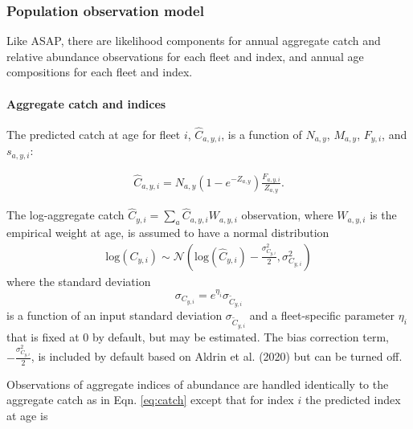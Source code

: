 \documentclass[]{article}
\let\oldparagraph\paragraph
\renewcommand{\paragraph}[1]{\oldparagraph{#1}\mbox{}}
\begin{document}
\hypertarget{population-observation-model}{%
\subsubsection{Population observation
model}\label{population-observation-model}}

Like ASAP, there are likelihood components for annual aggregate catch
and relative abundance observations for each fleet and index, and annual
age compositions for each fleet and index.

\hypertarget{aggregate-catch-and-indices}{%
\paragraph{Aggregate catch and
indices}\label{aggregate-catch-and-indices}}

The predicted catch at age for fleet \(i\), \(\hat{C}_{a,y,i}\), is a
function of \(N_{a,y}\), \(M_{a,y}\), \(F_{y,i}\), and \(s_{a,y,i}\):

\begin{equation}
\label{eq:predcatch}
  \begin{array}{ccc}
    \hat{C}_{a,y,i} = N_{a,y} \left(1- e^{-Z_{a,y}}\right)\frac{F_{a,y,i}}{Z_{a,y}}.
  \end{array}
\end{equation}

The log-aggregate catch
\(\hat{C}_{y,i} = \sum_a \hat{C}_{a,y,i}W_{a,y,i}\) observation, where
\(W_{a,y,i}\) is the empirical weight at age, is assumed to have a
normal distribution \begin{equation}
\label{eq:catch}
  \begin{array}{ccc}
    \text{log}(C_{y,i}) \sim \mathcal{N}\left( \text{log}(\hat{C}_{y,i}) - \frac{\sigma^2_{C_{y,i}}}{2}, \sigma^2_{C_{y,i}}\right)
  \end{array}
\end{equation} where the standard deviation \[
\sigma_{C_{y,i}} = e^{\eta_i}\sigma_{\tilde{C}_{y,i}}
\] is a function of an input standard deviation
\(\sigma_{\tilde{C}_{y,i}}\) and a fleet-specific parameter \(\eta_i\)
that is fixed at 0 by default, but may be estimated. The bias correction
term, \(- \frac{\sigma^2_{C_{y,i}}}{2}\), is included by default based
on Aldrin et al. (2020) but can be turned off.

Observations of aggregate indices of abundance are handled identically
to the aggregate catch as in Eqn. \ref{eq:catch} except that for index
\(i\) the predicted index at age is
\end{document}
